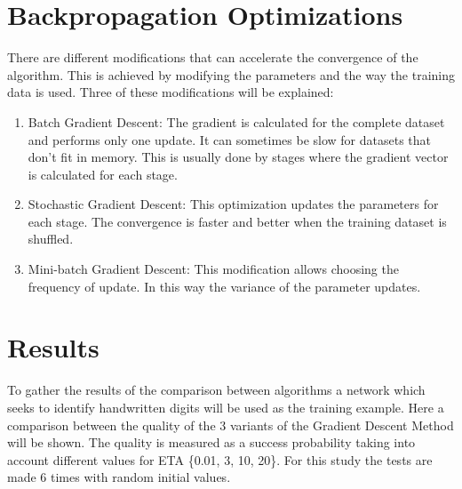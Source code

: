 \documentclass[a4paper, 12pt]{amsart}
\begin{document}
\section{Backpropagation Optimizations}
There are different modifications that can accelerate the convergence of the algorithm. This is achieved by 
modifying the parameters and the way the training data is used. Three of these modifications will be explained:
\\
\begin{enumerate}
\item Batch Gradient Descent: The gradient is calculated for the complete dataset and performs only one update. 
It can sometimes be slow for datasets that don't fit in memory. This is usually done by stages where the gradient vector is calculated for each stage.

\item Stochastic Gradient Descent: This optimization updates the parameters for each stage. The convergence is faster and better when the training dataset is shuffled.

\item Mini-batch Gradient Descent: This modification allows choosing the frequency of update. In this way the variance of the parameter updates.  

\end{enumerate}

\section{Results}
To gather the results of the comparison between algorithms a network which seeks to identify handwritten digits will be used as the training example.
Here a comparison between the quality of the 3 variants of the Gradient Descent Method will be shown. The quality is measured as a success probability taking into account different values for ETA \{0.01, 3, 10, 20\}.
For this study the tests are made 6 times with random initial values.\\
\end{document}
